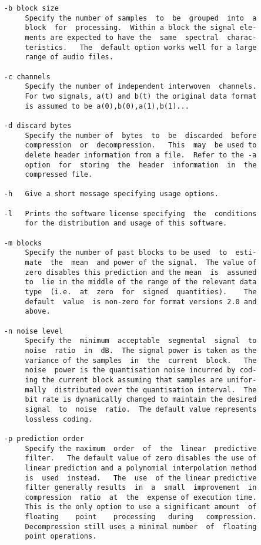 \begin{verbatim}
     -b block size
          Specify the number of samples  to  be  grouped  into  a
          block  for  processing.  Within a block the signal ele-
          ments are expected to have the  same  spectral  charac-
          teristics.   The  default option works well for a large
          range of audio files.

     -c channels
          Specify the number of independent interwoven  channels.
          For two signals, a(t) and b(t) the original data format
          is assumed to be a(0),b(0),a(1),b(1)...

     -d discard bytes
          Specify the number of  bytes  to  be  discarded  before
          compression  or  decompression.   This  may  be used to
          delete header information from a file.  Refer to the -a
          option  for  storing  the  header  information  in  the
          compressed file.

     -h   Give a short message specifying usage options.

     -l   Prints the software license specifying  the  conditions
          for the distribution and usage of this software.

     -m blocks
          Specify the number of past blocks to be used  to  esti-
          mate  the  mean  and power of the signal.  The value of
          zero disables this prediction and the mean  is  assumed
          to  lie in the middle of the range of the relevant data
          type  (i.e.  at  zero  for  signed  quantities).    The
          default  value  is non-zero for format versions 2.0 and
          above.

     -n noise level
          Specify the  minimum  acceptable  segmental  signal  to
          noise  ratio  in  dB.  The signal power is taken as the
          variance of the samples  in  the  current  block.   The
          noise  power is the quantisation noise incurred by cod-
          ing the current block assuming that samples are unifor-
          mally  distributed over the quantisation interval.  The
          bit rate is dynamically changed to maintain the desired
          signal  to  noise  ratio.  The default value represents
          lossless coding.

     -p prediction order
          Specify the maximum  order  of  the  linear  predictive
          filter.   The default value of zero disables the use of
          linear prediction and a polynomial interpolation method
          is  used  instead.   The  use  of the linear predictive
          filter generally results  in  a  small  improvement  in
          compression  ratio  at  the  expense of execution time.
          This is the only option to use a significant amount  of
          floating    point    processing   during   compression.
          Decompression still uses a minimal number  of  floating
          point operations.


\end{verbatim}
